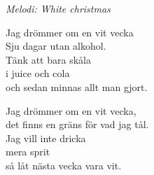 {\footnotesize\textit{Melodi: White christmas}}\par
\vspace{10pt}
Jag drömmer om en vit vecka\\
Sju dagar utan alkohol.\\
Tänk att bara skåla\\
i juice och cola\\
och sedan minnas allt man gjort.\par
\vspace{10pt}
Jag drömmer om en vit vecka,\\
det finns en gräns för vad jag tål.\\
Jag vill inte dricka\\
mera sprit\\
så låt nästa vecka vara vit.

